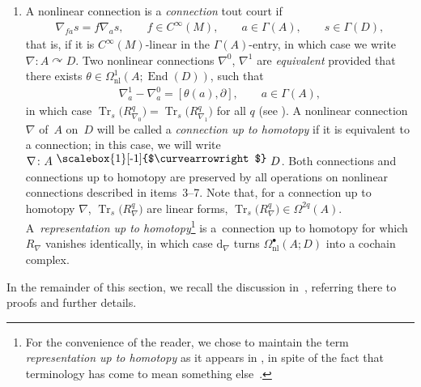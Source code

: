 \documentclass[pdftex]{sigma}
\numberwithin{equation}{section}
\newcommand{\acts}{\curvearrowright}
\newcommand{\homo}{ \ \raisebox{\depth}{\scalebox{1}[-1]{$\curvearrowright$}} \ }
\newcommand{\bd}{\partial}
\newcommand{\dd}{\mathrm{d}}
\newcommand{\8}{\infty}
\begin{document}
\begin{enumerate}
\begin{gather*}
 \phi_*(T_xN) + \varrho_A(A_{\phi(x)}) = T_{\phi(x)}M, \qquad x \in N,
\end{gather*}then there is a \emph{pullback Lie algebroid} $\phi^!(A):=TN \times_{TM}A$ on $N$, and an induced \emph{pullback morphism} of Lie algebroids $\big(\widetilde{\phi},\phi\big)\colon \phi^!(A) \to A$. In this case, we will write simply~$\phi^!\nabla$ and~$\phi^*$ instead of $\big(\widetilde{\phi},\phi\big)^!\nabla$ and $\big(\widetilde{\phi},\phi\big)^*$.
\item A nonlinear connection is a \emph{connection} tout court if
\begin{gather*}
 \nabla_{fa}s = f\nabla_as, \qquad f \in C^{\8}(M), \qquad a \in \Gamma(A), \qquad s \in \Gamma(D),
\end{gather*}that is, if it is $C^{\8}(M)$-linear in the $\Gamma(A)$-entry, in which case we write $\nabla\colon A \acts D$. Two nonlinear connections $\nabla^0$, $\nabla^1$ are \emph{equivalent} provided that there exists $\theta \in \Omega_{\mathrm{nl}}^1(A;\operatorname{End}(D))$, such that
\begin{gather*}
 \nabla^1_a -\nabla^0_a = [\theta(a),\bd], \qquad a \in \Gamma(A),
\end{gather*}in which case $\operatorname{Tr}_s\big(R_{\nabla_0}^q\big)=\operatorname{Tr}_s\big(R_{\nabla_1}^q\big)$ for all $q$ (see \cite{CrFer_Char}). A nonlinear connection~$\nabla$ of~$A$ on~$D$ will be called a \emph{connection up to homotopy} if it is equivalent to a connection; in this case, we will write $\nabla\colon A \homo D$. Both connections and connections up to homotopy are preserved by all operations on nonlinear connections described in items~3--7. Note that, for a connection up to homotopy $\nabla$, $\operatorname{Tr}_s\big(R_{\nabla}^q\big)$ are linear forms, $\operatorname{Tr}_s\big(R_{\nabla}^q\big) \in \Omega^{2q}(A)$. A~\emph{representation up to homotopy}\footnote{For the convenience of the reader, we chose to maintain the term \emph{representation up to homotopy} as it appears in \cite{CrainicNL,CrFer_Char}, in spite of the fact that terminology has come to mean something else~\cite{AbadCrainic}.} is a~connection up to homotopy for which $R_{\nabla}$ vanishes identically, in which case $\dd_{\nabla}$ turns $\Omega^{\bullet}_{\mathrm{nl}}(A;D)$ into a cochain complex.
\end{enumerate}
In the remainder of this section, we recall the discussion in~\cite{CrFer_Char}, referring there to proofs and further details.
\end{document}
